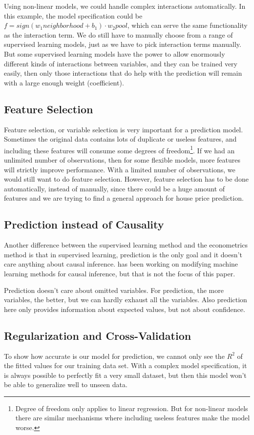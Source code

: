 \documentclass[a4paper]{article}
\begin{document}
Using non-linear models, we could handle complex interactions automatically. In this example, the model specification could be $f = sign(w_1 neighborhood + b_1) \cdot w_2pool$, which can serve the same functionality as the interaction term. We do still have to manually choose from a range of supervised learning models, just as we have to pick interaction terms manually. But some supervised learning models have the power to allow enormously different kinds of interactions between variables, and they can be trained very easily, then only those interactions that do help with the prediction will remain with a large enough weight (coefficient).

\subsection{Feature Selection}
Feature selection, or variable selection is very important for a prediction model. Sometimes the original data contains lots of duplicate or useless features, and including these features will consume some degrees of freedom\footnote{Degree of freedom only applies to linear regression. But for non-linear models there are similar mechanisms where including useless features make the model worse.}. If we had an unlimited number of observations, then for some flexible models, more features will strictly improve performance. With a limited number of observations, we would still want to do feature selection. However, feature selection has to be done automatically, instead of manually, since there could be a huge amount of features and we are trying to find a general approach for house price prediction.

\subsection{Prediction instead of Causality}
Another difference between the supervised learning method and the econometrics method is that in supervised learning, prediction is the only goal and it doesn't care anything about causal inference. \cite{AtheyQuora} has been working on modifying machine learning methods for causal inference, but that is not the focus of this paper.

Prediction doesn't care about omitted variables. For prediction, the more variables, the better, but we can hardly exhaust all the variables. Also prediction here only provides information about expected values, but not about confidence.

\subsection{Regularization and Cross-Validation}
To show how accurate is our model for prediction, we cannot only see the $R^2$ of the fitted values for our training data set. With a complex model specification, it is always possible to perfectly fit a very small dataset, but then this model won't be able to generalize well to unseen data.
\end{document}
